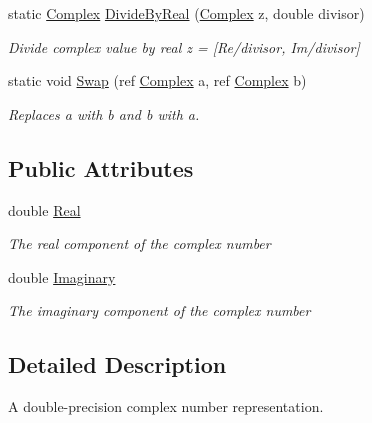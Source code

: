 \begin{DoxyCompactItemize}
static \mbox{\hyperlink{struct_c_s_i_1_1_library_1_1_data_types_1_1_complex}{Complex}} \mbox{\hyperlink{struct_c_s_i_1_1_library_1_1_data_types_1_1_complex_a9258fa8f1a0ae37481a3ff5e66e36e87}{Divide\+By\+Real}} (\mbox{\hyperlink{struct_c_s_i_1_1_library_1_1_data_types_1_1_complex}{Complex}} z, double divisor)
\begin{DoxyCompactList}\small\item\em Divide complex value by real z = \mbox{[}Re/divisor, Im/divisor\mbox{]} \end{DoxyCompactList}\item 
static void \mbox{\hyperlink{struct_c_s_i_1_1_library_1_1_data_types_1_1_complex_a2f3a5dd4b452787fece0a51a10eed13c}{Swap}} (ref \mbox{\hyperlink{struct_c_s_i_1_1_library_1_1_data_types_1_1_complex}{Complex}} a, ref \mbox{\hyperlink{struct_c_s_i_1_1_library_1_1_data_types_1_1_complex}{Complex}} b)
\begin{DoxyCompactList}\small\item\em Replaces a with b and b with a. \end{DoxyCompactList}\end{DoxyCompactItemize}
\subsection*{Public Attributes}
\begin{DoxyCompactItemize}
\item 
double \mbox{\hyperlink{struct_c_s_i_1_1_library_1_1_data_types_1_1_complex_aa93303373159836c5e138d274f7c170b}{Real}}
\begin{DoxyCompactList}\small\item\em The real component of the complex number \end{DoxyCompactList}\item 
double \mbox{\hyperlink{struct_c_s_i_1_1_library_1_1_data_types_1_1_complex_acc416ca539d366befec1407aa6eda524}{Imaginary}}
\begin{DoxyCompactList}\small\item\em The imaginary component of the complex number \end{DoxyCompactList}\end{DoxyCompactItemize}


\subsection{Detailed Description}
A double-\/precision complex number representation. 



